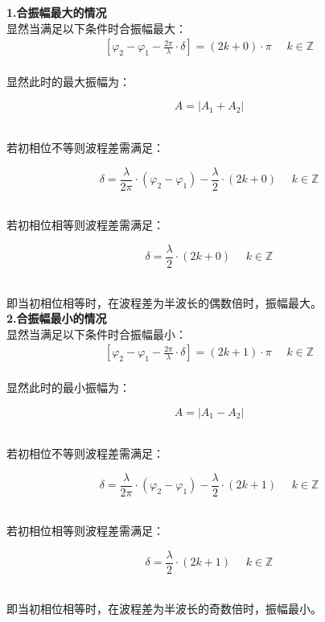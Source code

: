 \documentclass[UTF8]{ctexart}
\begin{document}
\newpage

    \textbf{1.合振幅最大的情况}\\[3mm]
    显然当满足以下条件时合振幅最大：
    \begin{align}
        \left[\varphi_2-\varphi_1-\frac{2\pi}{\lambda}\cdot\delta\right]=(2k+0)\cdot\pi~~~~~~k\in\mathbb{Z}
    \end{align}\\
    显然此时的最大振幅为：
    \begin{large}
        \begin{equation*}
            A=|A_1+A_2|
        \end{equation*}
    \end{large}\\
    若初相位不等则波程差需满足：
    \begin{large}
        \begin{equation*}
            \delta=\frac{\lambda}{2\pi}\cdot(\varphi_2-\varphi_1)-\frac{\lambda}{2}\cdot(2k+0)~~~~~~k\in\mathbb{Z}
        \end{equation*}
    \end{large}\\
    若初相位相等则波程差需满足：
    \begin{large}
        \begin{equation*}
            \delta=\frac{\lambda}{2}\cdot(2k+0)~~~~~~k\in\mathbb{Z}
        \end{equation*}
    \end{large}\\
    即当初相位相等时，在波程差为半波长的偶数倍时，振幅最大。\\[10mm]
    \textbf{2.合振幅最小的情况}\\[3mm]
    显然当满足以下条件时合振幅最小：
    \begin{align}
        \left[\varphi_2-\varphi_1-\frac{2\pi}{\lambda}\cdot\delta\right]=(2k+1)\cdot\pi~~~~~~k\in\mathbb{Z}
    \end{align}\\
    显然此时的最小振幅为：
    \begin{large}
        \begin{equation*}
            A=|A_1-A_2|
        \end{equation*}
    \end{large}\\
    若初相位不等则波程差需满足：
    \begin{large}
        \begin{equation*}
            \delta=\frac{\lambda}{2\pi}\cdot(\varphi_2-\varphi_1)-\frac{\lambda}{2}\cdot(2k+1)~~~~~~k\in\mathbb{Z}
        \end{equation*}
    \end{large}\\
    若初相位相等则波程差需满足：
    \begin{large}
        \begin{equation*}
            \delta=\frac{\lambda}{2}\cdot(2k+1)~~~~~~k\in\mathbb{Z}
        \end{equation*}
    \end{large}\\
    即当初相位相等时，在波程差为半波长的奇数倍时，振幅最小。
\end{document}
